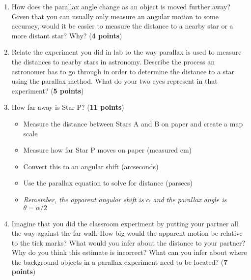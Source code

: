 \documentclass[notitlepage]{article}
\begin{document}
\begin{enumerate}

\item How does the parallax angle change as an object is moved further away? Given that you can usually only measure an angular motion to some accuracy, would it be easier to measure the distance to a nearby star or a more distant star? Why? ({\bf 4 points})\\
\vspace{2.5cm}

\newpage

\item Relate the experiment you did in lab to the way parallax is used to measure the distances to nearby stars in astronomy. Describe the process an astronomer has to go through in order to determine the distance to a star using the parallax method. What do your two eyes represent in that experiment? ({\bf 5 points})\\
\vspace{4cm}

\item How far away is Star P? ({\bf 11 points})
\begin{itemize}
\item Measure the distance between Stars A and B on paper and create a map scale
\item Measure how far Star P moves on paper (measured cm)
\item Convert this to an angular shift (arcseconds)
\item Use the parallax equation to solve for distance (parsecs)
\item \textit{Remember, the apparent angular shift is $\alpha$ and the parallax angle is $\theta = \alpha/2$}
\end{itemize}

\vspace{9cm}

\newpage

\item Imagine that you did the classroom experiment by putting your partner all the way against the far wall. How big would the apparent motion be relative to the tick marks? What would you infer about the distance to your partner? Why do you think this estimate is incorrect? What can you infer about where the background objects in a parallax experiment need to be located? ({\bf 7 points})\\
\vspace{6cm}

\end{enumerate}
\end{document}
